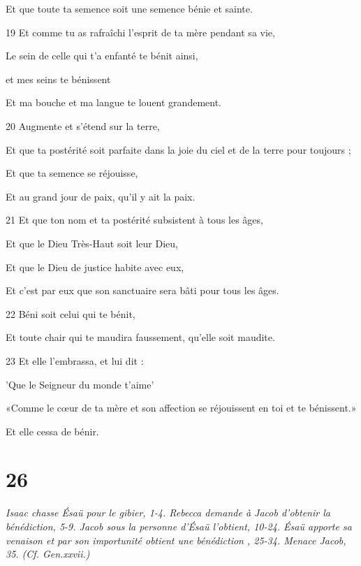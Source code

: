 \par     Et que toute ta semence soit une semence bénie et sainte.
\par    
\par 19 Et comme tu as rafraîchi l'esprit de ta mère pendant sa vie,  
\par     Le sein de celle qui t'a enfanté te bénit ainsi,
\par    
\par     [Mon affection] et mes seins te bénissent  
\par     Et ma bouche et ma langue te louent grandement.
\par    
\par 20 Augmente et s'étend sur la terre,  
\par     Et que ta postérité soit parfaite dans la joie du ciel et de la terre pour toujours ;
\par    
\par     Et que ta semence se réjouisse,  
\par     Et au grand jour de paix, qu'il y ait la paix.
\par    
\par 21 Et que ton nom et ta postérité subsistent à tous les âges,  
\par     Et que le Dieu Très-Haut soit leur Dieu,
\par    
\par     Et que le Dieu de justice habite avec eux,  
\par     Et c'est par eux que son sanctuaire sera bâti pour tous les âges.
\par    
\par 22 Béni soit celui qui te bénit,  
\par     Et toute chair qui te maudira faussement, qu'elle soit maudite.
\par    
\par 23 Et elle l'embrassa, et lui dit :  
\par     'Que le Seigneur du monde t'aime'  
\par     «Comme le cœur de ta mère et son affection se réjouissent en toi et te bénissent.»
\par     Et elle cessa de bénir.

\chapter{26}

\textit{Isaac chasse Ésaü pour le gibier, 1-4. Rebecca demande à Jacob d'obtenir la bénédiction, 5-9. Jacob sous la personne d'Ésaü l'obtient, 10-24. Ésaü apporte sa venaison et par son importunité obtient une bénédiction , 25-34. Menace Jacob, 35. (Cf. Gen.xxvii.)}

